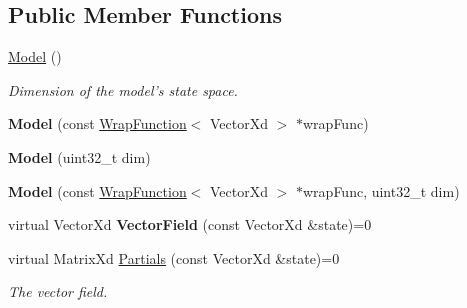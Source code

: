 \subsection*{Public Member Functions}
\begin{DoxyCompactItemize}
\item 
\hypertarget{struct_d_r_d_s_p_1_1_model_a2f892ad08042296572d273b386deb4d8}{\hyperlink{struct_d_r_d_s_p_1_1_model_a2f892ad08042296572d273b386deb4d8}{Model} ()}\label{struct_d_r_d_s_p_1_1_model_a2f892ad08042296572d273b386deb4d8}

\begin{DoxyCompactList}\small\item\em Dimension of the model's state space. \end{DoxyCompactList}\item 
\hypertarget{struct_d_r_d_s_p_1_1_model_af9ab80237f807fecc435534c8705ea8c}{{\bfseries Model} (const \hyperlink{struct_d_r_d_s_p_1_1_wrap_function}{Wrap\-Function}$<$ Vector\-Xd $>$ $\ast$wrap\-Func)}\label{struct_d_r_d_s_p_1_1_model_af9ab80237f807fecc435534c8705ea8c}

\item 
\hypertarget{struct_d_r_d_s_p_1_1_model_a79dabe991f920ca21ac23066270ab1b7}{{\bfseries Model} (uint32\-\_\-t dim)}\label{struct_d_r_d_s_p_1_1_model_a79dabe991f920ca21ac23066270ab1b7}

\item 
\hypertarget{struct_d_r_d_s_p_1_1_model_a6e682e5b23ddca692c45a3bc6be9dd15}{{\bfseries Model} (const \hyperlink{struct_d_r_d_s_p_1_1_wrap_function}{Wrap\-Function}$<$ Vector\-Xd $>$ $\ast$wrap\-Func, uint32\-\_\-t dim)}\label{struct_d_r_d_s_p_1_1_model_a6e682e5b23ddca692c45a3bc6be9dd15}

\item 
\hypertarget{struct_d_r_d_s_p_1_1_model_a3dd65a7f5c3b1e5e89920a309ff2abec}{virtual Vector\-Xd {\bfseries Vector\-Field} (const Vector\-Xd \&state)=0}\label{struct_d_r_d_s_p_1_1_model_a3dd65a7f5c3b1e5e89920a309ff2abec}

\item 
\hypertarget{struct_d_r_d_s_p_1_1_model_a36f5e07d59e484b0ddfc12ed820e55d1}{virtual Matrix\-Xd \hyperlink{struct_d_r_d_s_p_1_1_model_a36f5e07d59e484b0ddfc12ed820e55d1}{Partials} (const Vector\-Xd \&state)=0}\label{struct_d_r_d_s_p_1_1_model_a36f5e07d59e484b0ddfc12ed820e55d1}

\begin{DoxyCompactList}\small\item\em The vector field. \end{DoxyCompactList}\end{DoxyCompactItemize}
